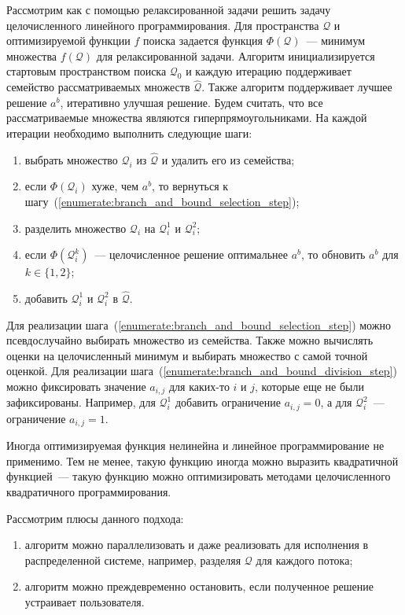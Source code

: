 \documentclass[times,specification,annotation]{itmo-student-thesis}
\begin{document}
Рассмотрим как с помощью релаксированной задачи решить задачу целочисленного линейного программирования.
Для пространства $\mathcal{Q}$ и оптимизируемой функции $f$ поиска задается функция $\Phi(\mathcal{Q})$~--- минимум множества $f(\mathcal{Q})$ для релаксированной задачи.
Алгоритм инициализируется стартовым пространством поиска $\mathcal{Q}_0$ и каждую итерацию поддерживает семейство рассматриваемых множеств $\hat{\mathcal{Q}}$.
Также алгоритм поддерживает лучшее решение $a^b$, итеративно улучшая решение.
Будем считать, что все рассматриваемые множества являются гиперпрямоугольниками.
На каждой итерации необходимо выполнить следующие шаги:

\begin{enumerate}
    \item \label{enumerate:branch_and_bound_selection_step} выбрать множество $\mathcal{Q}_i$ из $\hat{\mathcal{Q}}$ и удалить его из семейства;
    \item если $\Phi(\mathcal{Q}_i)$ хуже, чем $a^b$, то вернуться к шагу~(\ref{enumerate:branch_and_bound_selection_step});
    \item \label{enumerate:branch_and_bound_division_step} разделить множество $\mathcal{Q}_i$ на $\mathcal{Q}_i^1$ и $\mathcal{Q}_i^2$;
    \item если $\Phi(\mathcal{Q}_i^k)$~--- целочисленное решение оптимальнее $a^b$, то обновить $a^b$ для $k \in \{1, 2\}$;
    \item добавить $\mathcal{Q}_i^1$ и $\mathcal{Q}_i^2$ в $\hat{\mathcal{Q}}$.
\end{enumerate}

Для реализации шага~(\ref{enumerate:branch_and_bound_selection_step}) можно псевдослучайно выбирать множество из семейства.
Также можно вычислять оценки на целочисленный минимум и выбирать множество с самой точной оценкой.
Для реализации шага~(\ref{enumerate:branch_and_bound_division_step}) можно фиксировать значение $a_{i, j}$ для каких-то $i$ и $j$, которые еще не были зафиксированы.
Например, для $\mathcal{Q}_i^1$ добавить ограничение $a_{i, j} = 0$, а для $\mathcal{Q}_i^2$~--- ограничение $a_{i, j} = 1$.

Иногда оптимизируемая функция нелинейна и линейное программирование не применимо.
Тем не менее, такую функцию иногда можно выразить квадратичной функцией~--- такую функцию можно оптимизировать методами целочисленного квадратичного программирования.

Рассмотрим плюсы данного подхода:

\begin{enumerate}
    \item алгоритм можно параллелизовать и даже реализовать для исполнения в распределенной системе, например, разделяя $\mathcal{Q}$ для каждого потока;
    \item алгоритм можно преждевременно остановить, если полученное решение устраивает пользователя.
\end{enumerate}
\end{document}
